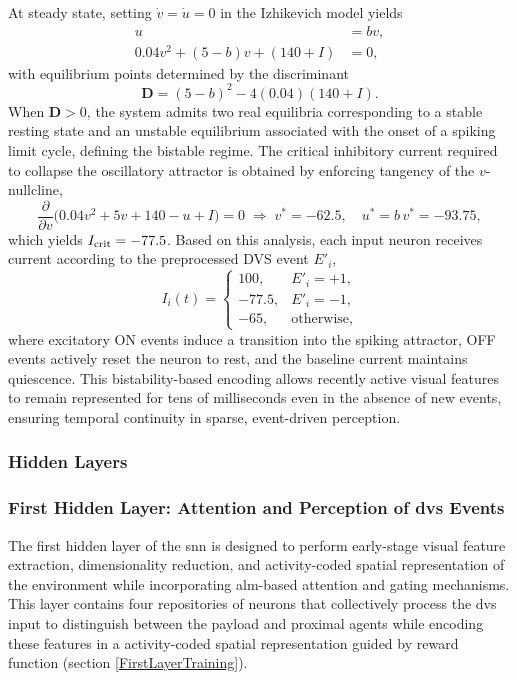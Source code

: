 At steady state, setting $\dot v=\dot u=0$ in the Izhikevich model yields
\begin{align}
u &= b v, \\
0.04v^2 + (5-b)v + (140+I) &= 0,
\end{align}
with equilibrium points determined by the discriminant
\begin{equation}
\mathbf{D} = (5 - b)^2 - 4(0.04)(140 + I).
\end{equation}
When $\mathbf{D}>0$, the system admits two real equilibria corresponding to a stable resting state and an unstable equilibrium associated with the onset of a spiking limit cycle, defining the bistable regime. The critical inhibitory current required to collapse the oscillatory attractor is obtained by enforcing tangency of the $v$-nullcline,
\begin{equation}
\frac{\partial}{\partial v}\bigl(0.04v^2 + 5v + 140 - u + I\bigr)=0
\;\Rightarrow\;
v^*=-62.5,\quad u^*=b\,v^*=-93.75,
\end{equation}
which yields $I_{\rm crit}=-77.5$. Based on this analysis, each input neuron receives current according to the preprocessed DVS event $E'_i$,
\begin{equation}
I_i(t)=
\begin{cases}
100, & E'_i=+1,\\
-77.5, & E'_i=-1,\\
-65, & \text{otherwise},
\end{cases}
\end{equation}
where excitatory ON events induce a transition into the spiking attractor, OFF events actively reset the neuron to rest, and the baseline current maintains quiescence. This bistability-based encoding allows recently active visual features to remain represented for tens of milliseconds even in the absence of new events, ensuring temporal continuity in sparse, event-driven perception.

\subsubsection{Hidden Layers}
\subsubsection*{First Hidden Layer: Attention and Perception of \ac{dvs} Events}

The first hidden layer of the \ac{snn} is designed to perform early-stage visual feature extraction, dimensionality reduction, and activity-coded spatial representation of the environment while incorporating \ac{alm}-based attention and gating mechanisms. This layer contains four repositories of neurons that collectively process the \ac{dvs} input to distinguish between the payload and proximal agents while encoding these features in a activity-coded spatial representation guided by reward function (section \ref{FirstLayerTraining}).

